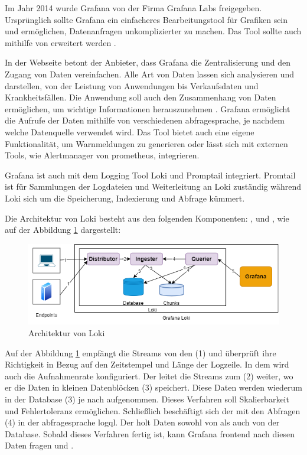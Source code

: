Im Jahr 2014 wurde Grafana von der Firma Grafana Labs freigegeben. Ursprünglich sollte Grafana ein einfacheres Bearbeitungstool für Grafiken sein und ermöglichen, Datenanfragen unkomplizierter zu machen. Das Tool sollte auch  mithilfe von  erweitert werden \citep{Oedegaard_historyGrafana}.

In der Webseite betont der Anbieter, dass Grafana die Zentralisierung und den Zugang von Daten vereinfachen. Alle Art von Daten lassen sich analysieren und darstellen, von der Leistung von Anwendungen bis Verkaufsdaten und Krankheitsfällen. Die Anwendung soll auch den Zusammenhang von Daten ermöglichen, um wichtige Informationen herauszunehmen \citep{Grafana_Grafana}. Grafana ermöglicht die Aufrufe der Daten mithilfe von verschiedenen \gls{abfragesprache}, je nachdem welche Datenquelle verwendet wird. Das Tool bietet auch eine eigene Funktionalität, um Warnmeldungen zu generieren oder lässt sich mit externen Tools, wie Alertmanager von \gls{prometheus}, integrieren. 

Grafana ist auch mit dem Logging Tool Loki und Promptail integriert. Promtail ist für Sammlungen der Logdateien und Weiterleitung an Loki zuständig während Loki sich um die Speicherung, Indexierung und Abfrage kümmert.

Die Architektur von Loki besteht aus den folgenden Komponenten: ,  und , wie auf der Abbildung
\ref{fig:Loki-Architektur} dargestellt:

\begin{figure}[H]
   \centering
   \includegraphics[width=1\textwidth]{assets/LokiArchitektur.drawio.png}
   \caption[Architektur von Loki]
   {Architektur von Loki \cite{Grafana_LokiArchitektur2}}
   \label{fig:Loki-Architektur}
   \centering
 \end{figure}
 
Auf der Abbildung \ref{fig:Loki-Architektur} empfängt   die Streams von den (1)  und überprüft ihre Richtigkeit in Bezug auf den Zeitstempel und Länge der Logzeile. In dem  wird auch die Aufnahmenrate konfiguriert. Der  leitet die Streams zum (2)  weiter, wo er die Daten in kleinen Datenblöcken (3) speichert. Diese Daten werden wiederum in der Database (3) je nach  aufgenommen. Dieses Verfahren soll Skalierbarkeit und Fehlertoleranz ermöglichen. Schließlich beschäftigt sich der  mit den Abfragen (4) in der \gls{abfragesprache} \gls{logql}. Der  holt Daten sowohl von  als auch von der Database. Sobald dieses Verfahren fertig ist, kann Grafana \gls{frontend} nach diesen Daten fragen \citep{Grafana_LokiArchitektur} und \citep{Grafana_LokiArchitektur2}.


